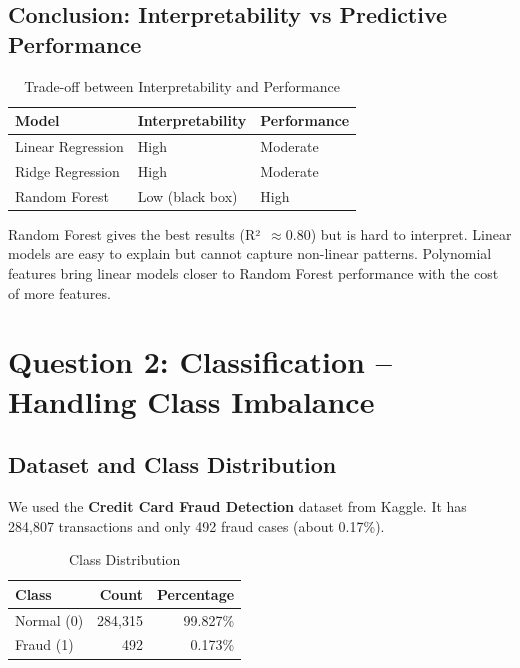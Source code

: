 \documentclass[11pt,a4paper]{article}
\begin{document}
\subsection{Conclusion: Interpretability vs Predictive Performance}

\begin{table}[H]
\centering
\caption{Trade-off between Interpretability and Performance}
\begin{tabular}{lll}
\toprule
\textbf{Model} & \textbf{Interpretability} & \textbf{Performance} \\
\midrule
Linear Regression & High & Moderate \\
Ridge Regression  & High & Moderate \\
Random Forest     & Low (black box) & High \\
\bottomrule
\end{tabular}
\end{table}

Random Forest gives the best results (R²~$\approx 0.80$) but is hard to interpret.
Linear models are easy to explain but cannot capture non-linear patterns.
Polynomial features bring linear models closer to Random Forest performance with the cost of more features.

\newpage

\section{Question 2: Classification -- Handling Class Imbalance}

\subsection{Dataset and Class Distribution}

We used the \textbf{Credit Card Fraud Detection} dataset from Kaggle.
It has 284{,}807 transactions and only 492 fraud cases (about 0.17\%).

\begin{table}[H]
\centering
\caption{Class Distribution}
\begin{tabular}{lrr}
\toprule
\textbf{Class} & \textbf{Count} & \textbf{Percentage} \\
\midrule
Normal (0) & 284{,}315 & 99.827\% \\
Fraud  (1) &     492   &  0.173\% \\
\bottomrule
\end{tabular}
\end{table}
\end{document}
